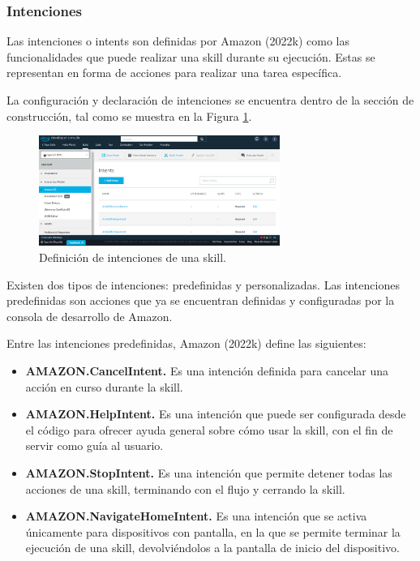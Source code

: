 
\subsubsection{Intenciones}
\label{IntencionescapIV}

Las intenciones o intents son definidas por Amazon (2022k) como las funcionalidades que puede realizar una skill durante su ejecución. Estas se representan en forma de acciones para realizar una tarea específica.

La configuración y declaración de intenciones se encuentra dentro de la sección de construcción, tal como se muestra en la Figura \ref{fig:46}.

\begin{figure}[H]
  \centering
  \includegraphics[width=0.70\textwidth]{Cap4/Figuras/Intenciones.png}
  \caption{Definición de intenciones de una skill.}
  \label{fig:46}
\end{figure}

Existen dos tipos de intenciones: predefinidas y personalizadas. Las intenciones predefinidas son acciones que ya se encuentran definidas y configuradas por la consola de desarrollo de Amazon.

Entre las intenciones predefinidas, Amazon (2022k) define las siguientes:

\begin{itemize}
  \item \textbf{AMAZON.CancelIntent.} Es una intención definida para cancelar una acción en curso durante la skill.
  \item \textbf{AMAZON.HelpIntent.} Es una intención que puede ser configurada desde el código para ofrecer ayuda general sobre cómo usar la skill, con el fin de servir como guía al usuario.
  \item \textbf{AMAZON.StopIntent.} Es una intención que permite detener todas las acciones de una skill, terminando con el flujo y cerrando la skill.
  \item \textbf{AMAZON.NavigateHomeIntent.} Es una intención que se activa únicamente para dispositivos con pantalla, en la que se permite terminar la ejecución de una skill, devolviéndolos a la pantalla de inicio del dispositivo.
\end{itemize}

